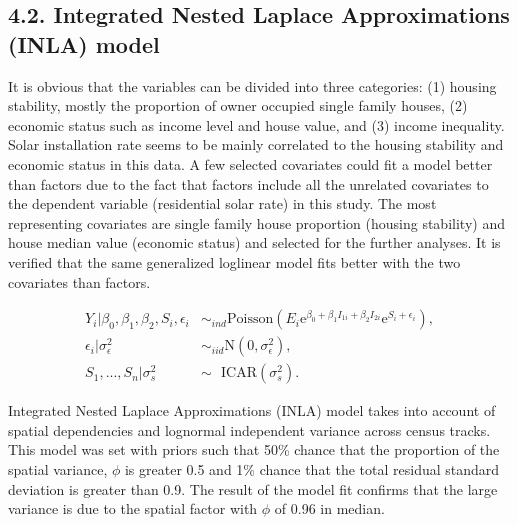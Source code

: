 \documentclass[11pt,]{article}
\begin{document}
\hypertarget{integrated-nested-laplace-approximations-inla-model}{%
\subsection{4.2. Integrated Nested Laplace Approximations (INLA)
model}\label{integrated-nested-laplace-approximations-inla-model}}

It is obvious that the variables can be divided into three categories:
(1) housing stability, mostly the proportion of owner occupied single
family houses, (2) economic status such as income level and house value,
and (3) income inequality. Solar installation rate seems to be mainly
correlated to the housing stability and economic status in this data. A
few selected covariates could fit a model better than factors due to the
fact that factors include all the unrelated covariates to the dependent
variable (residential solar rate) in this study. The most representing
covariates are single family house proportion (housing stability) and
house median value (economic status) and selected for the further
analyses. It is verified that the same generalized loglinear model fits
better with the two covariates than factors.

\[
\begin{aligned}
Y_i |\beta_{0},\beta_{1},\beta_{2},S_i,\epsilon_i & \sim_{ind} \mbox{Poisson}(E_i \mbox{e}^{\beta_{0}+\beta_{1}I_{1i}+\beta_{2}I_{2i}} \mbox{e}^{S_i + \epsilon_i}),\\ 
\epsilon_i | \sigma_\epsilon^{2} & \sim_{iid} \mbox{N}(0,\sigma_\epsilon^{2}),\\ 
S_1,...,S_n | \sigma_s^{2} & \sim ~~~ \mbox{ICAR}(\sigma_s^{2}). 
\end{aligned} 
\]

Integrated Nested Laplace Approximations (INLA) model takes into account
of spatial dependencies and lognormal independent variance across census
tracks. This model was set with priors such that 50\% chance that the
proportion of the spatial variance, \(\phi\) is greater 0.5 and 1\%
chance that the total residual standard deviation is greater than 0.9.
The result of the model fit confirms that the large variance is due to
the spatial factor with \(\phi\) of 0.96 in median.
\end{document}
